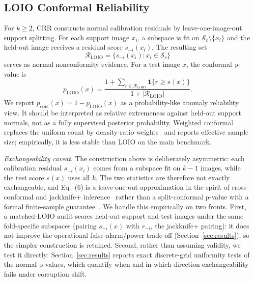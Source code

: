 \subsection{LOIO Conformal Reliability}
For $k\ge2$, CRR constructs normal calibration residuals by leave-one-image-out support splitting. For each support image $x_i$, a subspace is fit on $\mathcal{S}_c\setminus\{x_i\}$ and the held-out image receives a residual score $s_{-i}(x_i)$. The resulting set
\begin{equation}
    \mathcal{R}_{\mathrm{LOIO}}=\{s_{-i}(x_i):x_i\in\mathcal{S}_c\}
\end{equation}
serves as normal nonconformity evidence. For a test image $x$, the conformal p-value is
\begin{equation}
    p_{\mathrm{LOIO}}(x)=\frac{1+\sum_{r\in\mathcal{R}_{\mathrm{LOIO}}}\mathbf{1}\{r\ge s(x)\}}{1+|\mathcal{R}_{\mathrm{LOIO}}|}.
\end{equation}
We report $p_{\mathrm{conf}}(x)=1-p_{\mathrm{LOIO}}(x)$ as a probability-like anomaly reliability view. It should be interpreted as relative extremeness against held-out support normals, not as a fully supervised posterior probability. Weighted conformal replaces the uniform count by density-ratio weights~\cite{tibshirani2019covariate} and reports effective sample size; empirically, it is less stable than LOIO on the main benchmark.

\emph{Exchangeability caveat.} The construction above is deliberately asymmetric: each calibration residual $s_{-i}(x_i)$ comes from a subspace fit on $k{-}1$ images, while the test score $s(x)$ uses all $k$. The two statistics are therefore not exactly exchangeable, and Eq.~(6) is a leave-one-out approximation in the spirit of cross-conformal and jackknife+ inference~\cite{vovk2005,barber2021jackknife,hennhofer2024loio} rather than a split-conformal p-value with a formal finite-sample guarantee~\cite{bates2023testing,laxhammar2015inductive}. We handle this empirically on two fronts. First, a matched-LOIO audit scores held-out support and test images under the same fold-specific subspaces (pairing $s_{-i}(x)$ with $r_{-i}$, the jackknife+ pairing): it does not improve the operational false-alarm/power trade-off (Section~\ref{sec:results}), so the simpler construction is retained. Second, rather than assuming validity, we test it directly: Section~\ref{sec:results} reports exact discrete-grid uniformity tests of the normal p-values, which quantify when and in which direction exchangeability fails under corruption shift.


